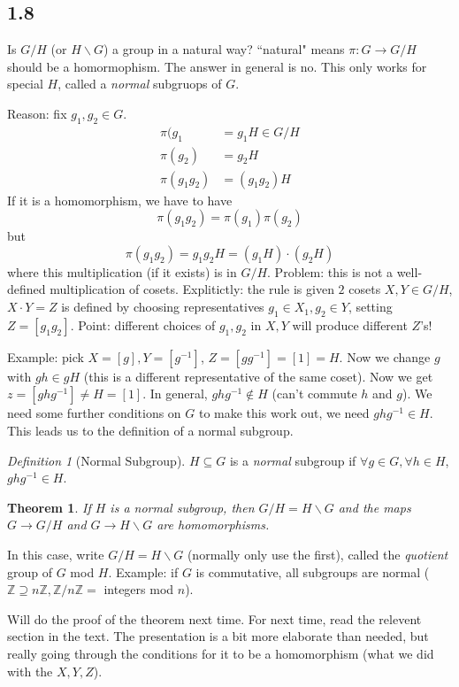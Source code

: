 \documentclass{article}
\theoremstyle{plain}
\newtheorem{theorem}{Theorem}
\theoremstyle{remark}
\newtheorem{definition}{Definition}
\newcommand{\Z}{{\mathbb Z}}
\begin{document}
\subsection{1.8}
Is $G / H$ (or $H \backslash G$) a group in a natural way?
``natural" means $\pi \colon G \to G / H$ should be a homormophism.
The answer in general is no.
This only works for special $H$, called a \emph{normal} subgruops of $G$.

Reason: fix $g_1, g_2 \in G$.
\begin{align*}
	\pi(g_1 &= g_1 H \in G / H\\
	\pi(g_2) &= g_2 H \\
	\pi(g_1 g_2) &= (g_1g_2)H
\end{align*}
If it is a homomorphism, we have to have
\[
	\pi(g_1g_2) = \pi(g_1)\pi(g_2)
\]
but
\[
	\pi(g_1g_2) = g_1g_2 H = (g_1 H) \cdot (g_2 H)
\]
where this multiplication (if it exists) is in $G / H$.
Problem: this is not a well-defined multiplication of cosets.
Explitictly: the rule is given $2$ cosets $X,Y \in G / H$,
$X \cdot Y = Z$ is defined by choosing representatives $g_1 \in X_1, g_2 \in Y$,
setting $Z = [g_1g_2]$.
Point: different choices of $g_1,g_2$ in $X,Y$ will produce different $Z$'s!

Example: pick $X = [g], Y = [g^{-1}]$,
$Z = [gg^{-1}] = [1] = H$.
Now we change $g$ with $gh \in gH$ (this is a different representative of the same coset).
Now we get $z = [ghg^{-1}] \neq H = [1]$.
In general, $ghg^{-1} \not\in H$ (can't commute $h$ and $g$).
We need some further conditions on $G$ to make this work out,
we need $ghg^{-1} \in H$.
This leads us to the definition of a normal subgroup.

\begin{definition}[Normal Subgroup]
	$H \subseteq G$ is a \emph{normal} subgroup if
	$\forall g \in G, \forall h \in H$, $ghg^{-1} \in H$.
\end{definition}
\begin{theorem}
	If $H$ is a normal subgroup, then $G / H = H \backslash G$
	and the maps $G \to G/H$ and $G \to H \backslash G$ are homomorphisms.
\end{theorem}
In this case, write $G / H = H \backslash G$ (normally only use the first),
called the \emph{quotient} group of $G$ mod $H$.
Example: if $G$ is commutative, all subgroups are normal
($\Z \supseteq n\Z, \Z/n\Z =$ integers mod $n$).

Will do the proof of the theorem next time.
For next time,
read the relevent section in the text.
The presentation is a bit more elaborate than needed,
but really going through the conditions for it to be a homomorphism
(what we did with the $X,Y,Z$).
\end{document}
